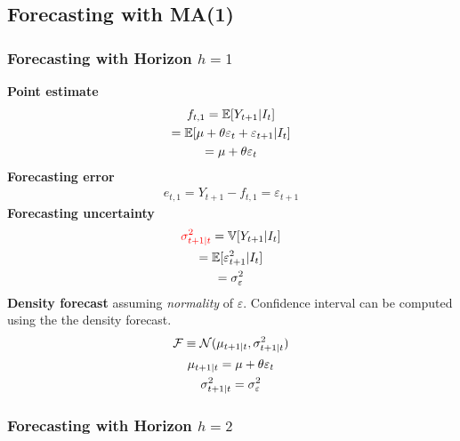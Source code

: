 \documentclass[11pt]{article}
\begin{document}
		\subsection{Forecasting with MA(1)}
			\subsubsection{Forecasting with Horizon $h=1$}
				\textbf{Point estimate}
					\begin{gather}
						f_{t,1} = \mathbb{E}[{Y_{t+1}|I_t}] \\
						= \mathbb{E}[{\mu + \theta \varepsilon_{t} + \varepsilon_{t+1}|I_t}] \\
						= \mu + \theta \varepsilon_t
					\end{gather}
				\textbf{Forecasting error}
					\begin{gather}
						e_{t,1} = Y_{t+1} - f_{t,1} = \varepsilon_{t+1}
					\end{gather}
				\textbf{Forecasting uncertainty}
					\begin{gather}
						\textcolor{red}{\sigma_{t+1|t}^2} = \mathbb{V}[{Y_{t+1}|I_t}] \\
						= \mathbb{E}[{\varepsilon_{t+1}^2|I_t}] \\
						= \sigma^2_\varepsilon
					\end{gather}
				\textbf{Density forecast} assuming \emph{normality} of $\varepsilon$. Confidence interval can be computed using the the density forecast.
					\begin{gather}
						\mathcal{{F}} \equiv \mathcal{{N}}(\mu_{t+1|t}, \sigma_{t+1|t}^2) \\
						\mu_{t+1|t} = \mu + \theta \varepsilon_t \\
						\sigma_{t+1|t}^2 =  \sigma^2_\varepsilon
					\end{gather}
			\subsubsection{Forecasting with Horizon $h=2$}
\end{document}
